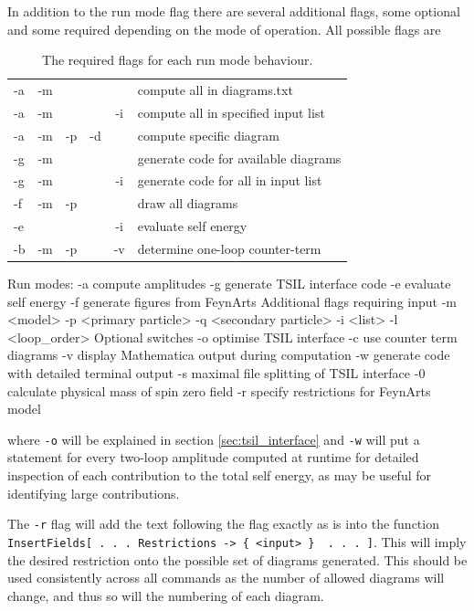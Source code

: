 In addition to the run mode flag there are several additional flags, some optional and some required depending on the mode of operation.  All possible flags are
\begin{table}
\caption{The required flags for each run mode behaviour.}
\begin{tabular}{l c c c c l} 
\hline
-a & -m & & & &compute all in diagrams.txt \\
-a & -m &  && -i&compute all in specified input list\\
-a & -m & -p & -d && compute specific diagram\\
-g & -m & & &  &generate code for available diagrams\\
-g & -m &  & & -i &generate code for all in input list\\
-f & -m & -p & & &draw all diagrams\\
-e &  & & & -i&evaluate self energy\\
-b & -m & -p & & -v&determine one-loop counter-term\\
\hline\end{tabular}
\end{table}
\begin{lstterm}
Run modes:
-a 		compute amplitudes
-g		generate TSIL interface code
-e		evaluate self energy
-f		generate figures from FeynArts
Additional flags requiring input
-m <model> 
-p <primary particle>
-q <secondary particle>
-i  <list>
-l <loop_order>
Optional switches
-o		optimise TSIL interface
-c		use counter term diagrams
-v		display Mathematica output during computation
-w		generate code with detailed terminal output
-s		maximal file splitting of TSIL interface
-0		calculate physical mass of spin zero field
-r		specify restrictions for FeynArts model
\end{lstterm}
where \lstinline{-o} will be explained in section \ref{sec:tsil_interface} and \lstinline{-w} will put a  statement for every two-loop amplitude computed at runtime for detailed inspection of each contribution to the total self energy, as may be useful for identifying large contributions.

The \lstinline{-r} flag will add the text following the flag exactly as is into the \feynarts function \lstinline|InsertFields[ . . . Restrictions -> { <input> }  . . . ]|.  This will imply the desired restriction onto the possible set of diagrams generated.  This should be used consistently across all commands as the number of allowed diagrams will change, and thus so will the numbering of each diagram.


